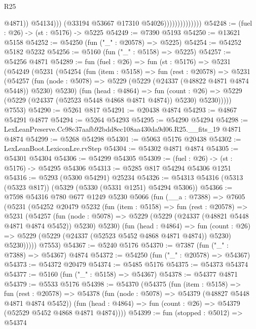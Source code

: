 \begin{lexlean}{R25}
\begin{coremodule}
                                        @4871))
                                    @54134)))
                              (@33194 @53667 @17310 @54026))))))))))))))
@54248 := (fuel : @26) -> (st : @5176) -> @5225
@54249 := @7390 @5193
@54250 := @13621 @5158
@54252 := @54250 (fun ("_" : @20578) => @5225)
@54254 := @54252 @5182 @5232
@54256 := @5160 (fun ("_" : @5158) => @5225)
@54257 := @54256 @4871
@54289 := fun (fuel : @26) =>
  fun (st : @5176) =>
  @5231
    (@54249
      (@5231
        (@54254
          (fun (item : @5158) =>
          fun (rest : @20578) =>
          @5231
            (@54257
              (fun (node : @5078) => @5229 (@5229 (@24337 (@48822 @4871 @4874 @5448)) @5230) @5230)
              (fun (head : @4864) =>
              fun (count : @26) =>
              @5229 (@5229 (@24337 (@52523 @5448 @4868 @4871 @4874)) @5230) @5230)))))
      @7553)
@54290 := @5261 @817
@54291 := @20438 @4874
@54293 := @4867 @54291 @4877
@54294 := @5264 @54293
@54295 := @54290 @54294
@54298 := LexLeanPreserve.Cc98c37aafb92bdd8ec108aa430da9d06.R25.__fits_19 @4871 @4874
@54299 := @5268 @54298
@54301 := @5063 @5176 @20438
@54302 := LexLeanBoot.LexiconLre.rvStep
@54304 := @54302 @4871 @4874
@54305 := @54301 @54304
@54306 := @54299 @54305
@54309 := (fuel : @26) -> (st : @5176) -> @54295 @54306
@54313 := @5285 @817 @54294 @54306 @1251
@54316 := @5293 (@5300 @54291) @25234
@54326 := @54313 @54316 (@5313 (@5323 @817)) (@5329 (@5330 (@5331 @1251) @54294 @5306))
@54366 := @7598
    @54316
    @780
    @677
    @1249
    @5230
    @5066
    (fun (__a : @7388) =>
    @7605
      (@5231
        (@54252
          @20479
          @5232
          (fun (item : @5158) =>
          fun (rest : @20578) =>
          @5231
            (@54257
              (fun (node : @5078) =>
              @5229 (@5229 (@24337 (@48821 @5448 @4871 @4874 @5452)) @5230) @5230)
              (fun (head : @4864) =>
              fun (count : @26) =>
              @5229 (@5229 (@24337 (@52523 @5452 @4868 @4871 @4874)) @5230) @5230)))))
      @7553)
@54367 := @5240 @5176
@54370 := @7387 (fun ("_" : @7388) => @54367) @4874
@54372 := @54250 (fun ("_" : @20578) => @54367)
@54373 := @54372 @20479
@54374 := @5485 @5176
@54375 := @54373 @54374
@54377 := @5160 (fun ("_" : @5158) => @54367)
@54378 := @54377 @4871
@54379 := @5533 @5176
@54398 := @54370
    (@54375
      (fun (item : @5158) =>
      fun (rest : @20578) =>
      @54378
        (fun (node : @5078) => @54379 (@48827 @5448 @4871 @4874 @5452))
        (fun (head : @4864) => fun (count : @26) => @54379 (@52529 @5452 @4868 @4871 @4874))))
@54399 := fun (stopped : @5012) => @54374

\end{coremodule}
\end{lexlean}
